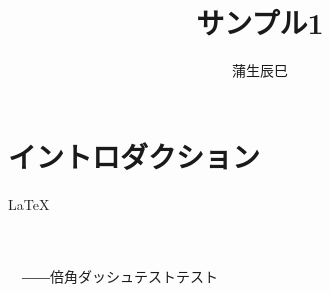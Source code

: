 

\title{サンプル1}
\author{蒲生辰巳}


\maketitle
\section{イントロダクション}
\LaTeX\\
\\
\\

　――倍角ダッシュ\tcy{!!}\zenaki{}テスト\zenaki{}テスト\zenaki{}

